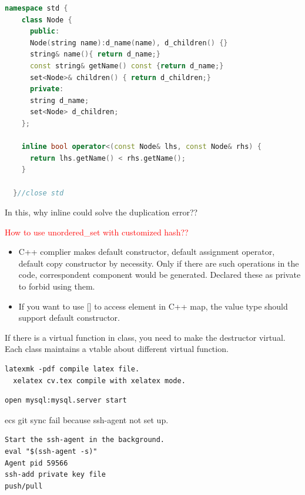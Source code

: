 \documentclass[a4paper]{tufte-handout}
\begin{document}
\begin{lstlisting}[language=c++]
  namespace std {
    class Node {
      public:
      Node(string name):d_name(name), d_children() {}
      string& name(){ return d_name;}
      const string& getName() const {return d_name;}
      set<Node>& children() { return d_children;}
      private:
      string d_name;
      set<Node> d_children;
    };

    inline bool operator<(const Node& lhs, const Node& rhs) {
      return lhs.getName() < rhs.getName();
    }

  }//close std

\end{lstlisting}
In this, why inline could solve the duplication error??

\textcolor{red}{How to use unordered\_set with customized hash??}
\begin{itemize}
\item C++ complier makes default constructor, default assignment operator, default copy constructor by necessity. Only if there are such operations in the code, correspondent component would be generated. Declared these as private to forbid using them.\\
\item If you want to use [] to access element in C++ map, the value type should support default constructor.
\end{itemize}

If there is a virtual function in class, you need to make the destructor virtual.
Each class maintains a vtable about different virtual function.

\begin{lstlisting}[]
  latexmk -pdf compile latex file.
  xelatex cv.tex compile with xelatex mode.
\end{lstlisting}

\begin{lstlisting}
open mysql:mysql.server start
\end{lstlisting}

ecs git sync fail because ssh-agent not set up.\\

\begin{lstlisting}
Start the ssh-agent in the background.
eval "$(ssh-agent -s)"
Agent pid 59566
ssh-add private key file
push/pull
\end{lstlisting}
\end{document}
